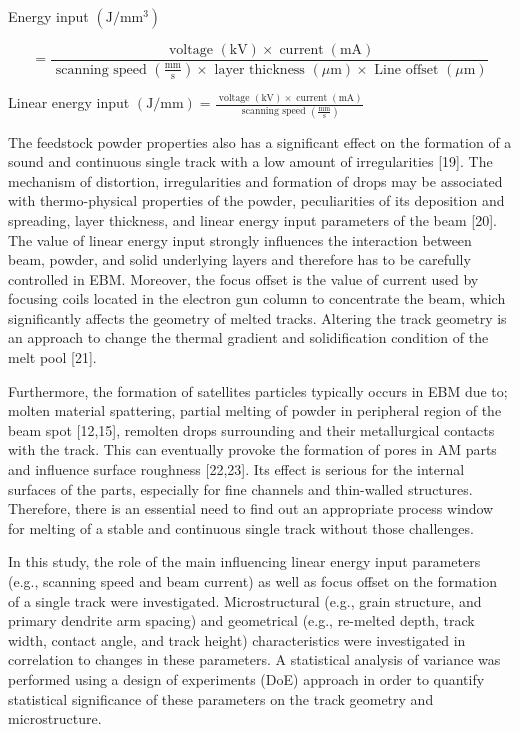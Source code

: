 \documentclass[10pt]{article}
\begin{document}
Energy input $\left(\mathrm{J} / \mathrm{mm}^{3}\right)$


\begin{equation*}
=\frac{\text { voltage }(\mathrm{kV}) \times \operatorname{current}(\mathrm{mA})}{\text { scanning speed }\left(\frac{\mathrm{mm}}{\mathrm{s}}\right) \times \text { layer thickness }(\mu \mathrm{m}) \times \text { Line offset }(\mu \mathrm{m})} \tag{1}
\end{equation*}


Linear energy input $(\mathrm{J} / \mathrm{mm})=\frac{\text { voltage }(\mathrm{kV}) \times \operatorname{current}(\mathrm{mA})}{\text { scanning speed }\left(\frac{\mathrm{mm}}{\mathrm{s}}\right)}$

The feedstock powder properties also has a significant effect on the formation of a sound and continuous single track with a low amount of irregularities [19]. The mechanism of distortion, irregularities and formation of drops may be associated with thermo-physical properties of the powder, peculiarities of its deposition and spreading, layer thickness, and linear energy input parameters of the beam [20]. The value of linear energy input strongly influences the interaction between beam, powder, and solid underlying layers and therefore has to be carefully controlled in EBM. Moreover, the focus offset is the value of current used by focusing coils located in the electron gun column to concentrate the beam, which significantly affects the geometry of melted tracks. Altering the track geometry is an approach to change the thermal gradient and solidification condition of the melt pool [21].

Furthermore, the formation of satellites particles typically occurs in EBM due to; molten material spattering, partial melting of powder in peripheral region of the beam spot [12,15], remolten drops surrounding and their metallurgical contacts with the track. This can eventually provoke the formation of pores in AM parts and influence surface roughness [22,23]. Its effect is serious for the internal surfaces of the parts, especially for fine channels and thin-walled structures. Therefore, there is an essential need to find out an appropriate process window for melting of a stable and continuous single track without those challenges.

In this study, the role of the main influencing linear energy input parameters (e.g., scanning speed and beam current) as well as focus offset on the formation of a single track were investigated. Microstructural (e.g., grain structure, and primary dendrite arm spacing) and geometrical (e.g., re-melted depth, track width, contact angle, and track height) characteristics were investigated in correlation to changes in these parameters. A statistical analysis of variance was performed using a design of experiments (DoE) approach in order to quantify statistical significance of these parameters on the track geometry and microstructure.
\end{document}
